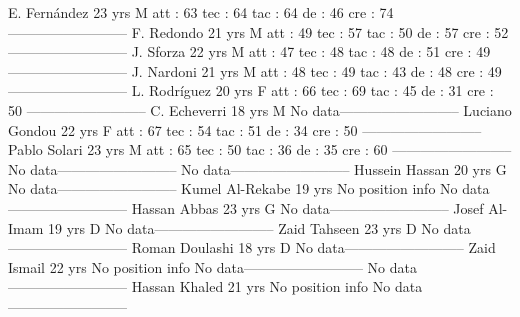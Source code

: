 E. Fernández  23 yrs 
M 
 att : 63 
 tec : 64 
 tac : 64 
 de : 46 
 cre : 74 
--------------------------
F. Redondo  21 yrs 
M 
 att : 49 
 tec : 57 
 tac : 50 
 de : 57 
 cre : 52 
--------------------------
J. Sforza  22 yrs 
M 
 att : 47 
 tec : 48 
 tac : 48 
 de : 51 
 cre : 49 
--------------------------
J. Nardoni  21 yrs 
M 
 att : 48 
 tec : 49 
 tac : 43 
 de : 48 
 cre : 49 
--------------------------
L. Rodríguez  20 yrs 
F 
 att : 66 
 tec : 69 
 tac : 45 
 de : 31 
 cre : 50 
--------------------------
C. Echeverri  18 yrs 
M 
No data--------------------------
Luciano Gondou  22 yrs 
F 
 att : 67 
 tec : 54 
 tac : 51 
 de : 34 
 cre : 50 
--------------------------
Pablo Solari  23 yrs 
M 
 att : 65 
 tec : 50 
 tac : 36 
 de : 35 
 cre : 60 
--------------------------
No data--------------------------
No data--------------------------
Hussein Hassan  20 yrs 
G 
No data--------------------------
Kumel Al-Rekabe  19 yrs 
No position info 
No data--------------------------
Hassan Abbas  23 yrs 
G 
No data--------------------------
Josef Al-Imam  19 yrs 
D 
No data--------------------------
Zaid Tahseen  23 yrs 
D 
No data--------------------------
Roman Doulashi  18 yrs 
D 
No data--------------------------
Zaid Ismail  22 yrs 
No position info 
No data--------------------------
No data--------------------------
Hassan Khaled  21 yrs 
No position info 
No data--------------------------
